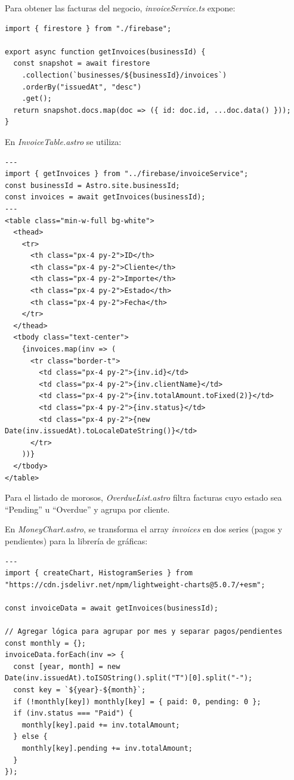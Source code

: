 \begin{large}

Para obtener las facturas del negocio, \textit{invoiceService.ts} expone:

\begin{verbatim}
import { firestore } from "./firebase";

export async function getInvoices(businessId) {
  const snapshot = await firestore
    .collection(`businesses/${businessId}/invoices`)
    .orderBy("issuedAt", "desc")
    .get();
  return snapshot.docs.map(doc => ({ id: doc.id, ...doc.data() }));
}
\end{verbatim}

En \textit{InvoiceTable.astro} se utiliza:

\begin{verbatim}
---
import { getInvoices } from "../firebase/invoiceService";
const businessId = Astro.site.businessId;
const invoices = await getInvoices(businessId);
---
<table class="min-w-full bg-white">
  <thead>
    <tr>
      <th class="px-4 py-2">ID</th>
      <th class="px-4 py-2">Cliente</th>
      <th class="px-4 py-2">Importe</th>
      <th class="px-4 py-2">Estado</th>
      <th class="px-4 py-2">Fecha</th>
    </tr>
  </thead>
  <tbody class="text-center">
    {invoices.map(inv => (
      <tr class="border-t">
        <td class="px-4 py-2">{inv.id}</td>
        <td class="px-4 py-2">{inv.clientName}</td>
        <td class="px-4 py-2">{inv.totalAmount.toFixed(2)}</td>
        <td class="px-4 py-2">{inv.status}</td>
        <td class="px-4 py-2">{new Date(inv.issuedAt).toLocaleDateString()}</td>
      </tr>
    ))}
  </tbody>
</table>
\end{verbatim}

Para el listado de morosos, \textit{OverdueList.astro} filtra facturas cuyo estado sea “Pending” u “Overdue” y agrupa por cliente.

En \textit{MoneyChart.astro}, se transforma el array \textit{invoices} en dos series (pagos y pendientes) para la librería de gráficas:

\begin{verbatim}
---
import { createChart, HistogramSeries } from "https://cdn.jsdelivr.net/npm/lightweight-charts@5.0.7/+esm";

const invoiceData = await getInvoices(businessId);

// Agregar lógica para agrupar por mes y separar pagos/pendientes
const monthly = {};
invoiceData.forEach(inv => {
  const [year, month] = new Date(inv.issuedAt).toISOString().split("T")[0].split("-");
  const key = `${year}-${month}`;
  if (!monthly[key]) monthly[key] = { paid: 0, pending: 0 };
  if (inv.status === "Paid") {
    monthly[key].paid += inv.totalAmount;
  } else {
    monthly[key].pending += inv.totalAmount;
  }
});


\end{verbatim}
\end{large}
